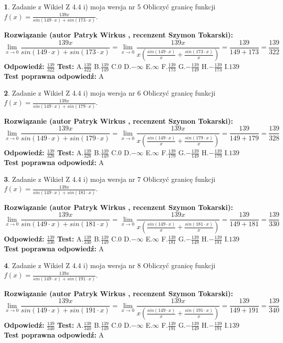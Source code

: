 \documentclass[12pt, a4paper]{article}
\theoremstyle{definition} %
\newtheorem{zad}{}
\newcommand{\zadStart}[1]{\begin{zad}#1\newline}
\newcommand{\zadStop}{\end{zad}}
\newcommand{\rozwStart}[2]{\noindent \textbf{Rozwiązanie (autor #1 , recenzent #2): }\newline}
\newcommand{\rozwStop}{\newline}
\newcommand{\odpStart}{\noindent \textbf{Odpowiedź:}\newline}
\newcommand{\odpStop}{\newline}
\newcommand{\testStart}{\noindent \textbf{Test:}\newline}
\newcommand{\testStop}{\newline}
\newcommand{\kluczStart}{\noindent \textbf{Test poprawna odpowiedź:}\newline}
\newcommand{\kluczStop}{\newline}
\begin{document}
\zadStart{Zadanie z Wikieł Z 4.4 i) moja wersja nr 5}
Obliczyć granicę funkcji $f(x)=\frac{139x}{sin(149\cdot x) +sin(173\cdot x)}$.
\zadStop
\rozwStart{Patryk Wirkus}{Szymon Tokarski}
$$\lim\limits_{x\to 0}\frac{139x}{sin(149\cdot x) +sin(173\cdot x)}=\lim\limits_{x\to 0}\frac{139x}{x(\frac{sin(149\cdot x)}{x}+\frac{sin(173\cdot x)}{x})}=\frac{139}{149+173} = \frac{139}{322}$$
\rozwStop
\odpStart
$\frac{139}{322}$
\odpStop
\testStart
A.$\frac{139}{322}$
B.$\frac{139}{149}$
C.$0$
D.$-\infty$
E.$\infty$
F.$\frac{139}{173}$
G.$-\frac{139}{149}$
H.$-\frac{139}{173}$
I.$139$
\testStop
\kluczStart
A
\kluczStop



\zadStart{Zadanie z Wikieł Z 4.4 i) moja wersja nr 6}
Obliczyć granicę funkcji $f(x)=\frac{139x}{sin(149\cdot x) +sin(179\cdot x)}$.
\zadStop
\rozwStart{Patryk Wirkus}{Szymon Tokarski}
$$\lim\limits_{x\to 0}\frac{139x}{sin(149\cdot x) +sin(179\cdot x)}=\lim\limits_{x\to 0}\frac{139x}{x(\frac{sin(149\cdot x)}{x}+\frac{sin(179\cdot x)}{x})}=\frac{139}{149+179} = \frac{139}{328}$$
\rozwStop
\odpStart
$\frac{139}{328}$
\odpStop
\testStart
A.$\frac{139}{328}$
B.$\frac{139}{149}$
C.$0$
D.$-\infty$
E.$\infty$
F.$\frac{139}{179}$
G.$-\frac{139}{149}$
H.$-\frac{139}{179}$
I.$139$
\testStop
\kluczStart
A
\kluczStop



\zadStart{Zadanie z Wikieł Z 4.4 i) moja wersja nr 7}
Obliczyć granicę funkcji $f(x)=\frac{139x}{sin(149\cdot x) +sin(181\cdot x)}$.
\zadStop
\rozwStart{Patryk Wirkus}{Szymon Tokarski}
$$\lim\limits_{x\to 0}\frac{139x}{sin(149\cdot x) +sin(181\cdot x)}=\lim\limits_{x\to 0}\frac{139x}{x(\frac{sin(149\cdot x)}{x}+\frac{sin(181\cdot x)}{x})}=\frac{139}{149+181} = \frac{139}{330}$$
\rozwStop
\odpStart
$\frac{139}{330}$
\odpStop
\testStart
A.$\frac{139}{330}$
B.$\frac{139}{149}$
C.$0$
D.$-\infty$
E.$\infty$
F.$\frac{139}{181}$
G.$-\frac{139}{149}$
H.$-\frac{139}{181}$
I.$139$
\testStop
\kluczStart
A
\kluczStop



\zadStart{Zadanie z Wikieł Z 4.4 i) moja wersja nr 8}
Obliczyć granicę funkcji $f(x)=\frac{139x}{sin(149\cdot x) +sin(191\cdot x)}$.
\zadStop
\rozwStart{Patryk Wirkus}{Szymon Tokarski}
$$\lim\limits_{x\to 0}\frac{139x}{sin(149\cdot x) +sin(191\cdot x)}=\lim\limits_{x\to 0}\frac{139x}{x(\frac{sin(149\cdot x)}{x}+\frac{sin(191\cdot x)}{x})}=\frac{139}{149+191} = \frac{139}{340}$$
\rozwStop
\odpStart
$\frac{139}{340}$
\odpStop
\testStart
A.$\frac{139}{340}$
B.$\frac{139}{149}$
C.$0$
D.$-\infty$
E.$\infty$
F.$\frac{139}{191}$
G.$-\frac{139}{149}$
H.$-\frac{139}{191}$
I.$139$
\testStop
\kluczStart
A
\kluczStop
\end{document}
